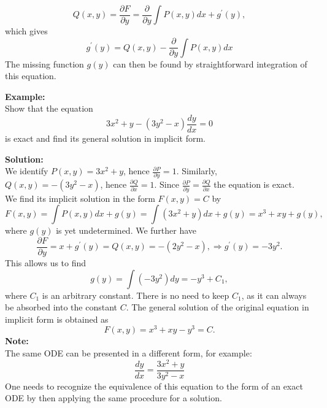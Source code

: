\documentclass[11pt,a4paper,twoside]{article}
\begin{document}
	\begin{equation}\label{1.23}
		Q(x,y)
		= \frac{\partial F}{\partial y}
		= \frac{\partial}{\partial y}\int P(x,y)dx + g^\prime(y),
	\end{equation}
	which gives
	\begin{equation}\label{1.24}
		g^\prime(y)
		= Q(x,y) - \frac{\partial}{\partial y}\int P(x,y)dx
	\end{equation}
	The missing function $g(y)$ can then be found by straightforward integration of this equation.\par
	\textbf{Example:}\\
	Show that the equation
	$$
	3x^2 + y - (3y^2-x)\frac{dy}{dx} = 0
	$$
	is exact and find its general solution in implicit form.\par
	\textbf{Solution:}\\
	We identify $P(x, y) = 3x^2 + y$, hence $\frac{\partial P}{\partial y} = 1$. Similarly, $Q(x,y) = -(3y^2-x)$, hence $\frac{\partial Q}{\partial x} = 1$. Since $\frac{\partial P}{\partial y} = \frac{\partial Q}{\partial x}$ the equation is exact.\\
	We find its implicit solution in the form $F(x, y) = C$ by
	$$
	F(x,y)
	= \int P(x,y)dx + g(y)
	= \int (3x^2 + y)dx + g(y)
	= x^3 + xy + g(y),
	$$
	where $g(y)$ is yet undetermined. We further have
	$$
	\frac{\partial F}{\partial y}
	= x + g^\prime(y)
	= Q(x,y)
	= -(2y^2 - x), \Rightarrow g^\prime(y) = -3y^2.
	$$
	This allows us to find
	$$
	g(y) = \int (-3y^2)dy = -y^3 + C_1,
	$$
	where $C_1$ is an arbitrary constant. There is no need to keep $C_1$, as it can always be absorbed into the constant $C$. The general solution of the original equation in implicit form is obtained as
	$$
	F(x,y) = x^3+xy-y^3 = C.
	$$
	\textbf{Note:}\\
	The same ODE can be presented in a different form, for example:
	$$
	\frac{dy}{dx} = \frac{3x^2+y}{3y^2-x}
	$$
	One needs to recognize the equivalence of this equation to the form of an exact ODE by then applying the same procedure for a solution.
\end{document}
